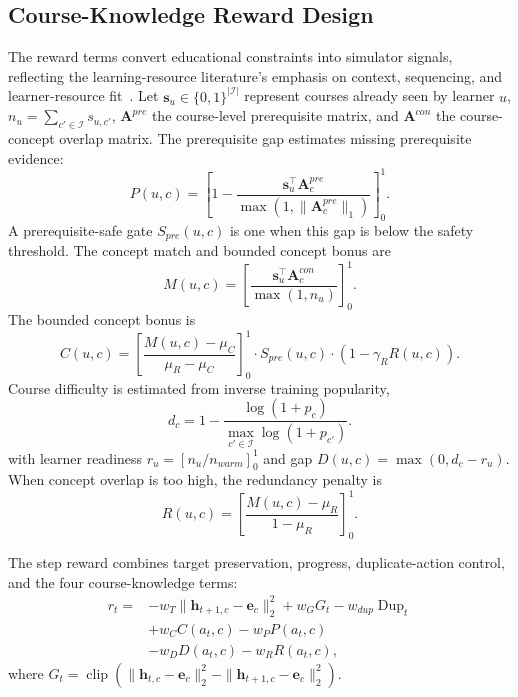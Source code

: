 \documentclass[letterpaper]{article}
\begin{document}
\subsection{Course-Knowledge Reward Design}
The reward terms convert educational constraints into simulator signals, reflecting the learning-resource literature's emphasis on context, sequencing, and learner-resource fit~\cite{dasilva2023educationalrs,rahayu2023learningpath}. Let \(\mathbf{s}_u\in\{0,1\}^{|\mathcal{I}|}\) represent courses already seen by learner \(u\), \(n_u=\sum_{c'\in\mathcal{I}} s_{u,c'}\), \(\mathbf{A}^{pre}\) the course-level prerequisite matrix, and \(\mathbf{A}^{con}\) the course-concept overlap matrix. The prerequisite gap estimates missing prerequisite evidence:
\begin{equation}
P(u,c)=
\left[
1-\frac{\mathbf{s}_u^\top \mathbf{A}^{pre}_{c}}
{\max(1,\|\mathbf{A}^{pre}_{c}\|_1)}
\right]_0^1.
\end{equation}
A prerequisite-safe gate \(S_{pre}(u,c)\) is one when this gap is below the safety threshold. The concept match and bounded concept bonus are
\begin{equation}
M(u,c)=
\left[
\frac{\mathbf{s}_u^\top \mathbf{A}^{con}_{c}}{\max(1,n_u)}
\right]_0^1.
\end{equation}
The bounded concept bonus is
\begin{equation}
C(u,c)=
\left[
\frac{M(u,c)-\mu_C}{\mu_R-\mu_C}
\right]_0^1
\cdot S_{pre}(u,c)\cdot (1-\gamma_R R(u,c)).
\end{equation}
Course difficulty is estimated from inverse training popularity,
\begin{equation}
d_c=1-\frac{\log(1+p_c)}
{\max_{c'\in\mathcal{I}} \log(1+p_{c'})}.
\end{equation}
with learner readiness \(r_u=[n_u/n_{warm}]_0^1\) and gap \(D(u,c)=\max(0,d_c-r_u)\). When concept overlap is too high, the redundancy penalty is
\begin{equation}
R(u,c)=
\left[
\frac{M(u,c)-\mu_R}{1-\mu_R}
\right]_0^1.
\end{equation}

The step reward combines target preservation, progress, duplicate-action control, and the four course-knowledge terms:
\begin{align}
r_t=&-w_T\|\mathbf{h}_{t+1,c}-\mathbf{e}_c\|_2^2
+w_G G_t-w_{dup}\operatorname{Dup}_t \nonumber\\
&+w_C C(a_t,c)-w_P P(a_t,c) \nonumber\\
&-w_D D(a_t,c)-w_R R(a_t,c),
\end{align}
where \(G_t=\operatorname{clip}(\|\mathbf{h}_{t,c}-\mathbf{e}_c\|_2^2-\|\mathbf{h}_{t+1,c}-\mathbf{e}_c\|_2^2)\).
\end{document}
